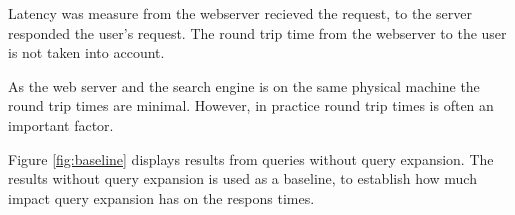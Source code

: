 Latency was measure from the webserver recieved the request, to the server responded the user's request.
The round trip time from the webserver to the user is not taken into account.

As the web server and the search engine is on the same physical machine the round trip times are minimal.
However, in practice round trip times is often an important factor.

Figure \ref{fig:baseline} displays results from queries without query expansion.
The results without query expansion is used as a baseline,
to establish how much impact query expansion has on the respons times.




